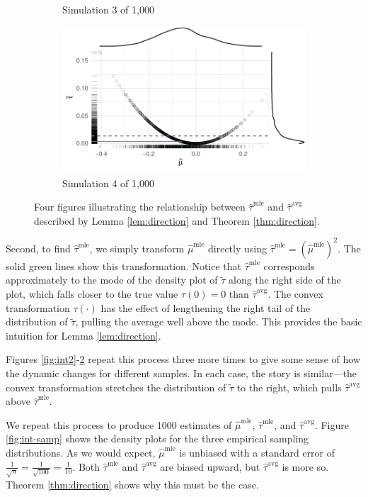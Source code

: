 \documentclass[11pt]{article}
\begin{document}
\begin{figure}
\begin{subfigure}{.5\textwidth}
  \caption{Simulation 3 of 1,000}
  \label{fig:int3}
\end{subfigure}%
\begin{subfigure}{.5\textwidth}
  \centering
  \includegraphics[width=.85\linewidth]{figs/intuition-4.pdf}
  \caption{Simulation 4 of 1,000}
  \label{fig:int4}
\end{subfigure}

\vspace{.1in}
\caption{Four figures illustrating the relationship between $\hat{\tau}^\text{mle}$ and $\hat{\tau}^\text{avg}$ described by Lemma \ref{lem:direction} and Theorem \ref{thm:direction}.}
\label{fig:int}
\end{figure}


Second, to find $\hat{\tau}^\text{mle}$, we simply transform $\hat{\mu}^\text{mle}$ directly using $\hat{\tau}^\text{mle} = \left( \hat{\mu}^\text{mle} \right) ^2$. The solid green lines show this transformation. Notice that $\hat{\tau}^\text{mle}$ corresponds approximately to the mode of the density plot of $\tilde{\tau}$ along the right side of the plot, which falls closer to the true value $\tau(0) = 0$ than $\hat{\tau}^\text{avg}$. The convex transformation $\tau(\cdot)$ has the effect of lengthening the right tail of the distribution of $\tilde{\tau}$, pulling the average well above the mode. This provides the basic intuition for Lemma \ref{lem:direction}.

Figures \ref{fig:int2}-\ref{fig:int4} repeat this process three more times to give some sense of how the dynamic changes for different samples. In each case, the story is similar---the convex transformation stretches the distribution of $\tilde{\tau}$ to the right, which pulls $\hat{\tau}^\text{avg}$ above $\hat{\tau}^\text{mle}$.

We repeat this process to produce 1000 estimates of $\hat{\mu}^\text{mle}$, $\hat{\tau}^\text{mle}$, and $\hat{\tau}^\text{avg}$.
Figure \ref{fig:int-samp} shows the density plots for the three empirical sampling distributions. As we would expect, $\hat{\mu}^\text{mle}$ is unbiased with a standard error of $\frac{1}{\sqrt{n}} = \frac{1}{\sqrt{100}} = \frac{1}{10}$. Both $\hat{\tau}^\text{mle}$ and $\hat{\tau}^\text{avg}$ are biased upward, but $\hat{\tau}^\text{avg}$ is more so. Theorem \ref{thm:direction} shows why this must be the case.
\end{document}
